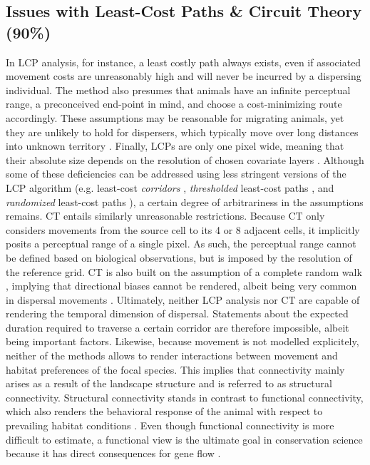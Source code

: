 \documentclass[abstract=on,10pt,a4paper,bibliography=totocnumbered]{article}
\begin{document}
\subsection{Issues with Least-Cost Paths \& Circuit Theory (90\%)}
In LCP analysis, for instance, a least costly path always exists, even if
associated movement costs are unreasonably high and will never be incurred by a
dispersing individual. The method also presumes that animals have an infinite
perceptual range, a preconceived end-point in mind, and choose a cost-minimizing
route accordingly. These assumptions may be reasonable for migrating animals,
yet they are unlikely to hold for dispersers, which typically move over long
distances into unknown territory \citep{Koen.2014, Abrahms.2017, Cozzi.2020}.
Finally, LCPs are only one pixel wide, meaning that their absolute size depends
on the resolution of chosen covariate layers \citep{Diniz.2020}. Although some
of these deficiencies can be addressed using less stringent versions of the LCP
algorithm (e.g. least-cost \textit{corridors} \citep{Pinto.2009},
\textit{thresholded} least-cost paths \citep{Landguth.2012}, and
\textit{randomized} least-cost paths \citep{Panzacchi.2016, VanMoorter.2021}), a
certain degree of arbitrariness in the assumptions remains. CT entails similarly
unreasonable restrictions. Because CT only considers movements from the source
cell to its 4 or 8 adjacent cells, it implicitly posits a perceptual range of a
single pixel. As such, the perceptual range cannot be defined based on
biological observations, but is imposed by the resolution of the reference grid.
CT is also built on the assumption of a complete random walk \citep{Diniz.2020},
implying that directional biases cannot be rendered, albeit being very common in
dispersal movements \citep{Cozzi.2020, Hofmann.2021}. Ultimately, neither LCP
analysis nor CT are capable of rendering the temporal dimension of dispersal.
Statements about the expected duration required to traverse a certain corridor
are therefore impossible, albeit being important factors. Likewise, because
movement is not modelled explicitely, neither of the methods allows to render
interactions between movement and habitat preferences of the focal species. This
implies that connectivity mainly arises as a result of the landscape structure
and is referred to as structural connectivity. Structural connectivity stands in
contrast to functional connectivity, which also renders the behavioral response
of the animal with respect to prevailing habitat conditions
\citep{Tischendorf.2000}. Even though functional connectivity is more difficult
to estimate, a functional view is the ultimate goal in conservation science
because it has direct consequences for gene flow \citep{Baguette.2013}.
\end{document}
